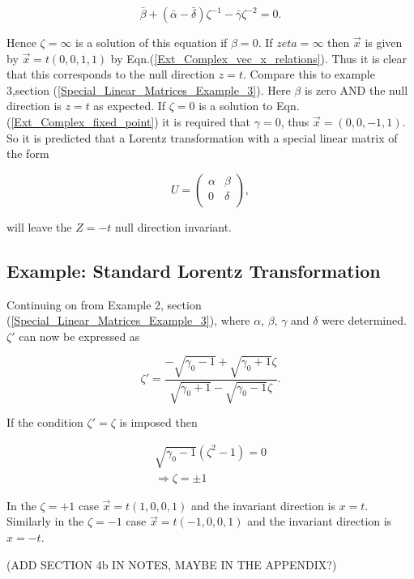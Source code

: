 \begin{equation*}
\bar{\beta} + (\bar{\alpha}- \bar{\delta})\zeta^{-1} - \bar{\gamma}\zeta^{-2} = 0.
\end{equation*}

\noindent Hence $\zeta = \infty$ is a solution of this equation if $\beta = 0$. If $zeta = \infty$ then $\vec{x}$ is given by $\vec{x} = t(0,0,1,1)$ by Eqn.(\ref{Ext_Complex_vec_x_relations}). Thus it is clear that this corresponds to the null direction $z=t$. Compare this to example 3,section (\ref{Special_Linear_Matrices_Example_3}). Here $\beta$ is zero AND the null direction is $z=t$ as expected. If $\zeta = 0$ is a solution to Eqn.(\ref{Ext_Complex_fixed_point}) it is required that $\gamma = 0$, thus $\vec{x} = (0,0,-1,1)$. So it is predicted that a Lorentz transformation with a special linear matrix of the form

\begin{equation*}   
U = 
\left(
\begin{array}{cc}
\alpha & \beta \\
0 & \delta \\
\end{array}
\right),
\end{equation*}   

\noindent will leave the $Z=-t$ null direction invariant.

\subsection{Example: Standard Lorentz Transformation}

Continuing on from Example 2, section (\ref{Special_Linear_Matrices_Example_3}), where $\alpha$, $\beta$, $\gamma$ and $\delta$ were determined. $\zeta'$ can now be expressed as

\begin{equation*} 
\zeta' = \frac{-\sqrt{\gamma_0 - 1} + \sqrt{\gamma_0 + 1}\zeta}{\sqrt{\gamma_0 + 1} - \sqrt{\gamma_0 - 1}\zeta}.
\end{equation*}

If the condition $\zeta' = \zeta$ is imposed then

\begin{eqnarray*}
\sqrt{\gamma_0 - 1}(\zeta^2 - 1) = 0 \\
\Rightarrow \zeta = \pm 1
\end{eqnarray*}

In the $\zeta = +1$ case $\vec{x} = t(1,0,0,1)$ and the invariant direction is $x=t$. Similarly in the $\zeta = -1$ case $\vec{x} = t(-1,0,0,1)$ and the invariant direction is $x = - t$. 

(ADD SECTION 4b IN NOTES, MAYBE IN THE APPENDIX?)





   












